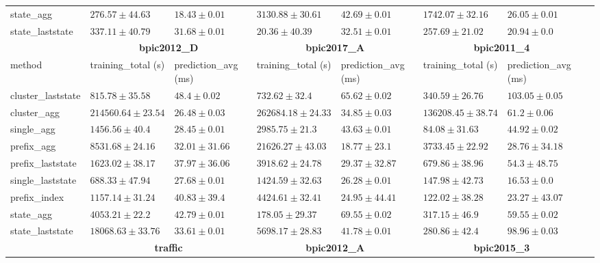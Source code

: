 \begin{table}[!htbp]
{\begin{tabular}{llllllll}
			state\_agg & $276.57 \pm 44.63$ & $\mathbf{18.43 \pm 0.01}$ & $3130.88 \pm 30.61$ & $42.69 \pm 0.01$ & $1742.07 \pm 32.16$ & $26.05 \pm 0.01$ \\ 
			state\_laststate & $337.11 \pm 40.79$ & $31.68 \pm 0.01$ & $\mathbf{20.36 \pm 40.39}$ & $32.51 \pm 0.01$ & $257.69 \pm 21.02$ & $\mathbf{20.94 \pm 0.0}$ \\ 
			\bottomrule
			\toprule
			& \multicolumn{2}{c}{{\bfseries bpic2012\_D}} & \multicolumn{2}{c}{{\bfseries bpic2017\_A}} & \multicolumn{2}{c}{{\bfseries bpic2011\_4}} \\ \cmidrule(lr){2-3} \cmidrule(lr){4-5} \cmidrule(lr){6-7}
			method  & training\_total (s) & prediction\_avg (ms) & training\_total (s) & prediction\_avg (ms) & training\_total (s) & prediction\_avg (ms) \\ \midrule
			cluster\_laststate & $815.78 \pm 35.58$ & $48.4 \pm 0.02$ & $732.62 \pm 32.4$ & $65.62 \pm 0.02$ & $340.59 \pm 26.76$ & $103.05 \pm 0.05$ \\ 
			cluster\_agg & $214560.64 \pm 23.54$ & $\mathbf{26.48 \pm 0.03}$ & $262684.18 \pm 24.33$ & $34.85 \pm 0.03$ & $136208.45 \pm 38.74$ & $61.2 \pm 0.06$ \\ 
			single\_agg & $1456.56 \pm 40.4$ & $28.45 \pm 0.01$ & $2985.75 \pm 21.3$ & $43.63 \pm 0.01$ & $\mathbf{84.08 \pm 31.63}$ & $44.92 \pm 0.02$ \\ 
			prefix\_agg & $8531.68 \pm 24.16$ & $32.01 \pm 31.66$ & $21626.27 \pm 43.03$ & $\mathbf{18.77 \pm 23.1}$ & $3733.45 \pm 22.92$ & $28.76 \pm 34.18$ \\ 
			prefix\_laststate & $1623.02 \pm 38.17$ & $37.97 \pm 36.06$ & $3918.62 \pm 24.78$ & $29.37 \pm 32.87$ & $679.86 \pm 38.96$ & $54.3 \pm 48.75$ \\ 
			single\_laststate & $\mathbf{688.33 \pm 47.94}$ & $27.68 \pm 0.01$ & $1424.59 \pm 32.63$ & $26.28 \pm 0.01$ & $147.98 \pm 42.73$ & $\mathbf{16.53 \pm 0.0}$ \\ 
			prefix\_index & $1157.14 \pm 31.24$ & $40.83 \pm 39.4$ & $4424.61 \pm 32.41$ & $24.95 \pm 44.41$ & $122.02 \pm 38.28$ & $23.27 \pm 43.07$ \\ 
			state\_agg & $4053.21 \pm 22.2$ & $42.79 \pm 0.01$ & $\mathbf{178.05 \pm 29.37}$ & $69.55 \pm 0.02$ & $317.15 \pm 46.9$ & $59.55 \pm 0.02$ \\ 
			state\_laststate & $18068.63 \pm 33.76$ & $33.61 \pm 0.01$ & $5698.17 \pm 28.83$ & $41.78 \pm 0.01$ & $280.86 \pm 42.4$ & $98.96 \pm 0.03$ \\ 
			\bottomrule
			\toprule
			& \multicolumn{2}{c}{{\bfseries traffic}} & \multicolumn{2}{c}{{\bfseries bpic2012\_A}} & \multicolumn{2}{c}{{\bfseries bpic2015\_3}} \\ \cmidrule(lr){2-3} \cmidrule(lr){4-5} \cmidrule(lr){6-7}

\end{tabular}}
\end{table}
